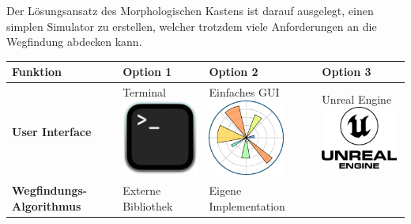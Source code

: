 \documentclass[../main.tex]{subfiles}
\begin{document}
Der Lösungsansatz des Morphologischen Kastens ist darauf ausgelegt, einen simplen Simulator zu erstellen, welcher trotzdem viele Anforderungen an die Wegfindung abdecken kann.


\begin{table}[htbp!]
    \centering
    \begin{tabularx}{\textwidth}{| X | Y | Y | Y |}
        \hline

        \textbf{Funktion} & \textbf{Option 1} & \textbf{Option 2} & \textbf{Option 3} \\ \hline
        
        \textbf{User Interface} &     
        Terminal \newline
        \includegraphics[width=2.5cm]{img/simulation/morphologischer-kasten/terminal.png}
        &
        Einfaches GUI \newline
        \includegraphics[width=2.5cm]{img/simulation/morphologischer-kasten/simple-gui.png}
        &
        Unreal Engine \newline
        \includegraphics[width=2.5cm]{img/simulation/morphologischer-kasten/unreal-engine-logo.png}
        \\ \hline
        
        \textbf{Wegfindungs-Algorithmus}  &
        Externe Bibliothek &
        Eigene Implementation &
        \\ \hline
        

\end{tabularx}
\end{table}
\end{document}
